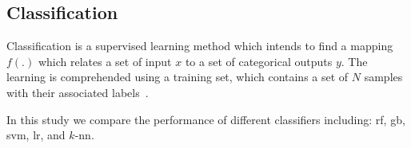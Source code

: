 
\subsection{Classification}\label{subsec:cls}
Classification is a supervised learning method which intends to find a mapping $f(.)$ which relates a set of input $x$ to a set of categorical outputs $y$.
The learning is comprehended using a training set, which contains a set of $N$ samples with their associated labels~\cite{murphy2012machine}.

In this study we compare the performance of different classifiers including: \ac{rf}, \ac{gb}, \ac{svm}, \ac{lr}, and $k$-\ac{nn}.

